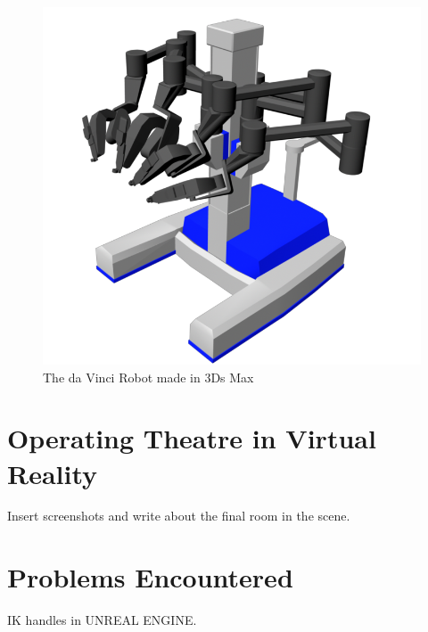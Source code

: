 \documentclass[paper=a4, fontsize=11pt]{scrartcl} %
\numberwithin{equation}{section} %
\numberwithin{figure}{section} %
\numberwithin{table}{section} %
\begin{document}
\begin{figure}[H]
\centering
\includegraphics[width=\textwidth]{plz.png}
\caption{The da Vinci Robot made in 3Ds Max}
\end{figure}

\section{Operating Theatre in Virtual Reality}
Insert screenshots and write about the final room in the scene. 

\section{Problems Encountered}

IK handles in UNREAL ENGINE.


\end{document}
